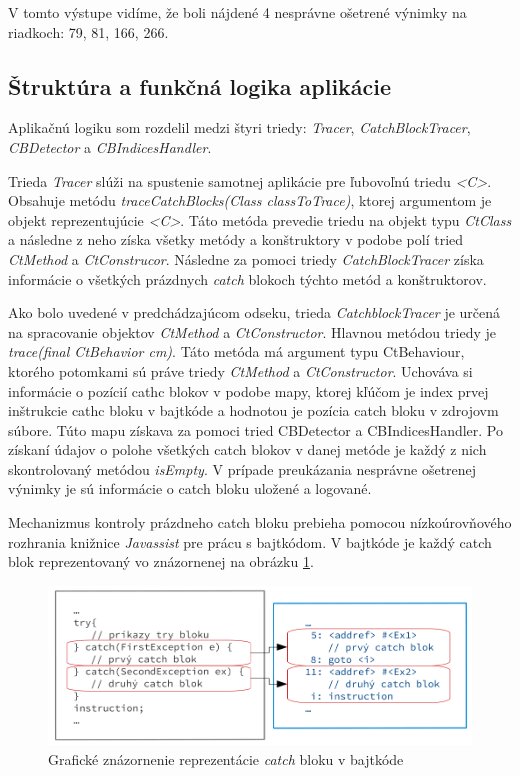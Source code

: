 \documentclass[11pt,final,oneside]{fithesis}
\begin{document}
V tomto výstupe vidíme, že boli nájdené 4 nesprávne ošetrené výnimky na riadkoch: 79, 81, 166, 266.

\subsection{Štruktúra a funkčná logika aplikácie}

Aplikačnú logiku som rozdelil medzi štyri triedy: \textit{Tracer}, \textit{CatchBlockTracer}, \textit{CBDetector} a \textit{CBIndicesHandler}. 

Trieda \textit{Tracer} slúži na spustenie samotnej aplikácie pre ľubovoľnú triedu \textit{<C>}. Obsahuje metódu \textit{traceCatchBlocks(Class classToTrace)}, ktorej argumentom je objekt reprezentujúcie \textit{<C>}. Táto metóda prevedie triedu na objekt typu \textit{CtClass} a následne z neho získa všetky metódy a konštruktory v podobe polí tried \textit{CtMethod} a \textit{CtConstrucor}. Následne za pomoci triedy \textit{CatchBlockTracer} získa informácie o všetkých prázdnych \textit{catch} blokoch týchto metód a konštruktorov. 

Ako bolo uvedené v predchádzajúcom odseku, trieda \textit{CatchblockTracer} je určená na spracovanie objektov \textit{CtMethod} a \textit{CtConstructor}. Hlavnou metódou triedy je \textit{trace(final CtBehavior cm)}. Táto metóda má argument typu CtBehaviour, ktorého potomkami sú práve triedy \textit{CtMethod} a \textit{CtConstructor}. Uchováva si informácie o pozícií cathc blokov v podobe mapy, ktorej kľúčom je index prvej inštrukcie cathc bloku v bajtkóde a hodnotou je pozícia catch bloku v zdrojovm súbore. Túto mapu získava za pomoci tried CBDetector a CBIndicesHandler. Po získaní údajov o polohe všetkých catch blokov v danej metóde je každý z nich skontrolovaný metódou \textit{isEmpty}. V prípade preukázania nesprávne ošetrenej výnimky je sú informácie o catch bloku uložené a logované. 

Mechanizmus kontroly prázdneho catch bloku prebieha pomocou nízkoúrovňového rozhrania knižnice \textit{Javassist} pre prácu s bajtkódom. V bajtkóde je každý catch blok reprezentovaný vo znázornenej na obrázku \ref{fig:catch}.

\begin{figure}[h]
  \centering
   \includegraphics[width=\textwidth]{catch.png}
  \caption{Grafické znázornenie reprezentácie \textit{catch} bloku v bajtkóde}
  \label{fig:catch}
\end{figure}
\end{document}
